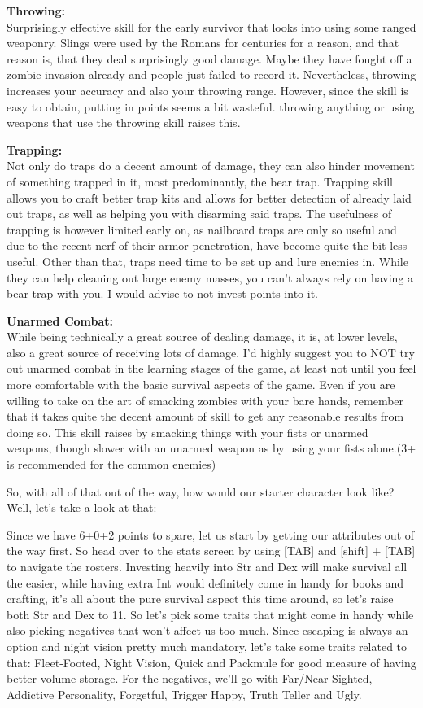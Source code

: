 \textbf{Throwing:}\\Surprisingly effective skill for the early survivor that looks into using some ranged weaponry. Slings were used by the Romans for centuries for a reason, and that reason is, that they deal surprisingly good damage. Maybe they have fought off a zombie invasion already and people just failed to record it. Nevertheless, throwing increases your accuracy and also your throwing range. However, since the skill is easy to obtain, putting in points seems a bit wasteful. throwing anything or using weapons that use the throwing skill raises this.

\textbf{Trapping:}\\Not only do traps do a decent amount of damage, they can also hinder movement of something trapped in it, most predominantly, the bear trap. Trapping skill allows you to craft better trap kits and allows for better detection of already laid out traps, as well as helping you with disarming said traps. The usefulness of trapping is however limited early on, as nailboard traps are only so useful and due to the recent nerf of their armor penetration, have become quite the bit less useful. Other than that, traps need time to be set up and lure enemies in. While they can help cleaning out large enemy masses, you can't always rely on having a bear trap with you. I would advise to not invest points into it.

\textbf{Unarmed Combat:}\\While being technically a great source of dealing damage, it is, at lower levels, also a great source of receiving lots of damage. I'd highly suggest you to NOT try out unarmed combat in the learning stages of the game, at least not until you feel more comfortable with the basic survival aspects of the game. Even if you are willing to take on the art of smacking zombies with your bare hands, remember that it takes quite the decent amount of skill to get any reasonable results from doing so. This skill raises by smacking things with your fists or unarmed weapons, though slower with an unarmed weapon as by using your fists alone.(3+ is recommended for the common enemies)

\vspace{1\baselineskip}
So, with all of that out of the way, how would our starter character look like? Well, let's take a look at that:

Since we have 6+0+2 points to spare, let us start by getting our attributes out of the way first. So head over to the stats screen by using [TAB] and [shift] + [TAB] to navigate the rosters. Investing heavily into Str and Dex will make survival all the easier, while having extra Int would definitely come in handy for books and crafting, it's all about the pure survival aspect this time around, so let's raise both Str and Dex to 11. So let's pick some traits that might come in handy while also picking negatives that won't affect us too much. Since escaping is always an option and night vision pretty much mandatory, let's take some traits related to that: Fleet-Footed, Night Vision, Quick and Packmule for good measure of having better volume storage. For the negatives, we'll go with Far/Near Sighted, Addictive Personality, Forgetful, Trigger Happy, Truth Teller and Ugly.

